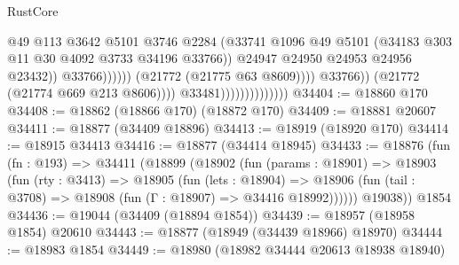 \begin{lexlean}{RustCore}
\begin{coremodule}
                                                            @49
                                                            @113
                                                            @3642
                                                            @5101
                                                            @3746
                                                            @2284
                                                            (@33741
                                                              @1096
                                                              @49
                                                              @5101
                                                              (@34183
                                                                @303
                                                                @11
                                                                @30
                                                                @4092
                                                                @3733
                                                                @34196
                                                                @33766))
                                                            @24947
                                                            @24950
                                                            @24953
                                                            @24956
                                                            @23432))
                                                        @33766))))))
                                            (@21772 (@21775 @63 @8609))))
                                        @33766))
                                    (@21772 (@21774 @669 @213 @8606))))
                                @33481))))))))))))))
@34404 := @18860 @170
@34408 := @18862 (@18866 @170) (@18872 @170)
@34409 := @18881 @20607
@34411 := @18877 (@34409 @18896)
@34413 := @18919 (@18920 @170)
@34414 := @18915 @34413
@34416 := @18877 (@34414 @18945)
@34433 := @18876
    (fun (fn : @193) =>
    @34411
      (@18899
        (@18902
          (fun (params : @18901) =>
          @18903
            (fun (rty : @3413) =>
            @18905
              (fun (lets : @18904) =>
              @18906 (fun (tail : @3708) => @18908 (fun (Γ : @18907) => @34416 @18992))))))
        @19038))
    @1854
@34436 := @19044 (@34409 (@18894 @1854))
@34439 := @18957 (@18958 @1854) @20610
@34443 := @18877 (@18949 (@34439 @18966) @18970)
@34444 := @18983 @1854
@34449 := @18980 (@18982 @34444 @20613 @18938 @18940)

\end{coremodule}
\end{lexlean}
